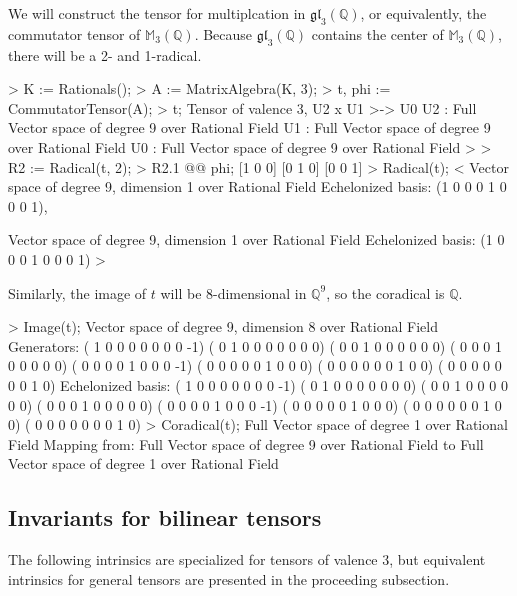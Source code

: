 \begin{example}[Radicals]

We will construct the tensor for multiplcation in $\mathfrak{gl}_3(\mathbb{Q})$, or equivalently, the commutator tensor of $\mathbb{M}_3(\mathbb{Q})$.
Because $\mathfrak{gl}_3(\mathbb{Q})$ contains the center of $\mathbb{M}_3(\mathbb{Q})$, there will be a 2- and 1-radical.
\begin{code}
> K := Rationals();
> A := MatrixAlgebra(K, 3);
> t, phi := CommutatorTensor(A);
> t;
Tensor of valence 3, U2 x U1 >-> U0
U2 : Full Vector space of degree 9 over Rational Field
U1 : Full Vector space of degree 9 over Rational Field
U0 : Full Vector space of degree 9 over Rational Field
> 
> R2 := Radical(t, 2);
> R2.1 @@ phi;
[1 0 0]
[0 1 0]
[0 0 1]
> Radical(t);
<
    Vector space of degree 9, dimension 1 over Rational Field
    Echelonized basis:
    (1 0 0 0 1 0 0 0 1),

    Vector space of degree 9, dimension 1 over Rational Field
    Echelonized basis:
    (1 0 0 0 1 0 0 0 1)
>
\end{code}

Similarly, the image of $t$ will be 8-dimensional in $\mathbb{Q}^9$, so the coradical is $\mathbb{Q}$.
\begin{code}
> Image(t);
Vector space of degree 9, dimension 8 over Rational Field
Generators:
( 1  0  0  0  0  0  0  0 -1)
( 0  1  0  0  0  0  0  0  0)
( 0  0  1  0  0  0  0  0  0)
( 0  0  0  1  0  0  0  0  0)
( 0  0  0  0  1  0  0  0 -1)
( 0  0  0  0  0  1  0  0  0)
( 0  0  0  0  0  0  1  0  0)
( 0  0  0  0  0  0  0  1  0)
Echelonized basis:
( 1  0  0  0  0  0  0  0 -1)
( 0  1  0  0  0  0  0  0  0)
( 0  0  1  0  0  0  0  0  0)
( 0  0  0  1  0  0  0  0  0)
( 0  0  0  0  1  0  0  0 -1)
( 0  0  0  0  0  1  0  0  0)
( 0  0  0  0  0  0  1  0  0)
( 0  0  0  0  0  0  0  1  0)
> Coradical(t);
Full Vector space of degree 1 over Rational Field
Mapping from: Full Vector space of degree 9 over Rational Field to Full
Vector space of degree 1 over Rational Field
\end{code}
\end{example}


\subsection{Invariants for bilinear tensors}

The following intrinsics are specialized for tensors of valence 3, but equivalent intrinsics for general tensors are presented in the proceeding subsection.

